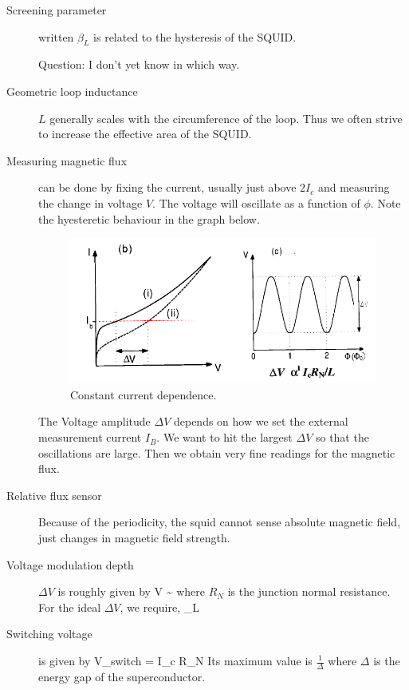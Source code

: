 \begin{description}
\item[Screening parameter] written $\beta_L$ is related to the hysteresis of the SQUID. 

Question: I don't yet know in which way. 

\item[Geometric loop inductance] $L$ generally scales with the circumference of the loop. Thus we often strive to increase the effective area of the SQUID. 


\item[Measuring magnetic flux] can be done by fixing the current, usually just above $2I_c$ and measuring the change in voltage $V$. The voltage will oscillate as a function of $\phi$. Note the hyesteretic behaviour in the graph below. 

\begin{figure}[h]
  \caption{Constant current dependence.}
  \centering
    \includegraphics[width=\textwidth]{./SC_figures/Constant_Current_Measurement.PNG}
\end{figure}

The Voltage amplitude $\Delta V$ depends on how we set the external measurement current $I_B$. We want to hit the largest $\Delta V$ so that the oscillations are large. Then we obtain very fine readings for the magnetic flux. 

\item[Relative flux sensor] Because of the periodicity, the squid cannot sense absolute magnetic field, just changes in magnetic field strength. 

\item[Voltage modulation depth] $\Delta V$ is roughly given by 
\beq
\Delta V \sim {}
\eeq
where $R_N$ is the junction normal resistance. For the ideal $\Delta V$, we require, 
\beq
\beta_L 
\eeq

\item[Switching voltage] is given by 
\beq
V_{switch} = I_c R_N
\eeq
Its maximum value is $\frac{1}{\Delta}$ where $\Delta$ is the energy gap of the superconductor. 


\end{description}
